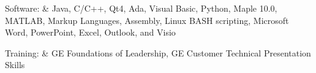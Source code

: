 \documentclass{resume}
\begin{document}

  \begin{skills}
    Software: & Java, C/C++, Qt4, Ada, Visual Basic, Python, Maple 10.0, MATLAB, Markup Languages, Assembly, Linux BASH scripting, Microsoft Word, PowerPoint, Excel, Outlook, and Visio \\
  \end{skills}
  \par
  \begin{skills}
    Training: & GE Foundations of Leadership, GE Customer Technical Presentation Skills \\
  \end{skills}
\end{document}
